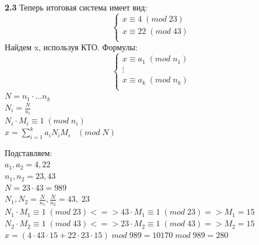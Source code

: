 \documentclass[12pt]{article}
\begin{document}
\begin{flushleft}
    \hspace{1.25cm}\textbf{2.3} Теперь итоговая система имеет вид: \\
        \begin{equation}
        \begin{cases}
             x \equiv 4 \; (mod \; 23) \\
             x \equiv 22 \; (mod \; 43) \\
        \end{cases}
        \end{equation}
    \hspace{1.25cm}Найдем x, используя КТО. Формулы: \\
        \begin{equation}
            \begin{cases}
                x \equiv a_1 \; (mod \; n_1) \\
                \vdots \\
                x \equiv a_k \; (mod \; n_k) \\
            \end{cases}
        \end{equation}
        \hspace{1.25cm}$ N = n_1 \cdot \dots n_k $ \\
        \hspace{1.25cm}$ N_i = \frac{N}{n_i} $ \\
        \hspace{1.25cm}$ N_i \cdot M_i \equiv 1 \; (mod \; n_i) $ \\
        \hspace{1.25cm}$ x = \sum_{i=1}^k a_i N_i M_i \;\;\; (mod \; N) $ \\
        \vspace{10pt}

        \hspace{1.25cm}Подставляем: \\
        \hspace{1.25cm}$ a_1, a_2 = 4, 22 $ \\
        \hspace{1.25cm}$ n_1, n_2 = 23, 43 $ \\
        \hspace{1.25cm}$ N = 23 \cdot 43 = 989 $ \\
        \hspace{1.25cm}$ N_1, N_2 = \frac{N}{n_1}, \frac{N}{n_2} = 43, \; 23 $ \\
        \hspace{1.25cm}$ N_1 \cdot M_1 \equiv 1 \; (mod \; 23) <=> 43 \cdot M_1 \equiv 1 \; (mod \; 23) => M_1 = 15 $ \\
        \hspace{1.25cm}$ N_2 \cdot M_2 \equiv 1 \; (mod \; 43) <=> 23 \cdot M_2 \equiv 1 \; (mod \; 43) => M_2 = 15 $ \\
        \hspace{1.25cm}$ x = (4 \cdot 43 \cdot 15 + 22 \cdot 23 \cdot 15) \; mod \; 989 = 10170 \; mod \; 989 = 280 $ \\ 
        \vspace{10pt}


\end{flushleft}
\end{document}
